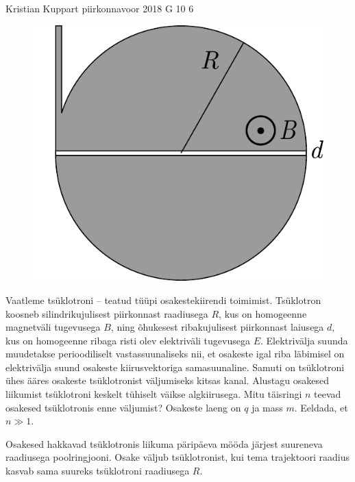 {Kristian Kuppart} %
{piirkonnavoor} %
{2018} %
{G 10} %
{6} %
{
\ifStatement
\begin{figure}
	\begin{center}
		\includegraphics[width=\linewidth]{2018-v2g-10-tsyklotron}
	\end{center}
\end{figure}

Vaatleme tsüklotroni -- teatud tüüpi osakestekiirendi toimimist. Tsüklotron koosneb silindrikujulisest piirkonnast raadiusega $R$, kus on homogeenne magnetväli tugevusega $B$, ning õhukesest ribakujulisest piirkonnast laiusega $d$, kus on homogeenne ribaga risti olev elektriväli tugevusega $E$. Elektrivälja suunda muudetakse perioodiliselt vastassuunaliseks nii, et osakeste igal riba läbimisel on elektrivälja suund osakeste kiirusvektoriga samasuunaline. Samuti on tsüklotroni ühes ääres osakeste tsüklotronist väljumiseks kitsas kanal. Alustagu osakesed liikumist tsüklotroni keskelt tühiselt väikse algkiirusega. Mitu täisringi $n$ teevad osakesed tsüklotronis enne väljumist? Osakeste laeng on $q$ ja mass $m$. Eeldada, et $n\gg 1.$
\fi


\ifHint
Osakesed hakkavad tsüklotronis liikuma päripäeva mööda järjest suureneva raadiusega poolringjooni. Osake väljub tsüklotronist, kui tema trajektoori raadius kasvab sama suureks tsüklotroni raadiusega $R$.
\fi


}
